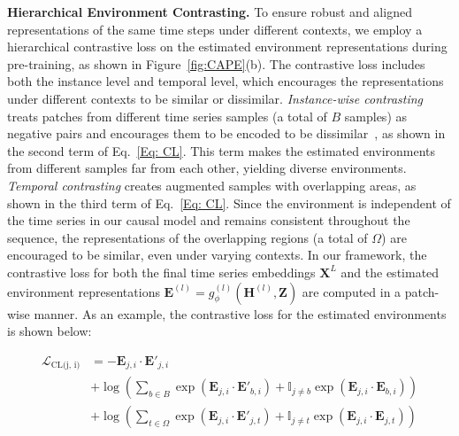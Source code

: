 \noindent\textbf{Hierarchical Environment Contrasting.} 
To ensure robust and aligned representations of the same time steps under different contexts, we employ a hierarchical contrastive loss on the estimated environment representations during pre-training, as shown in Figure~\ref{fig:CAPE}(b). The contrastive loss includes both the instance level and temporal level, which encourages the representations under different contexts to be similar or dissimilar.
\textit{Instance-wise contrasting} treats patches from different time series samples (a total of $B$ samples) as negative pairs and encourages them to be encoded to be dissimilar~\cite{yue2022ts2vec}, as shown in the second term of Eq.~\ref{Eq: CL}. This term makes the estimated environments from different samples far from each other, yielding diverse environments.
\textit{Temporal contrasting} creates augmented samples with overlapping areas, as shown in the third term of Eq.~\ref{Eq: CL}. 
Since the environment is independent of the time series in our causal model and remains consistent throughout the sequence, the representations of the overlapping regions (a total of $\Omega$) are encouraged to be similar, even under varying contexts\cite{yue2022ts2vec}.
In our framework, the contrastive loss for both the final time series embeddings \( \mathbf{X}^{L} \) and the estimated environment representations $\mathbf{E}^{(l)} = g_{\phi}^{(l)}(\mathbf{H}^{(l)}, \mathbf{Z})$ are computed in a patch-wise manner. As an example, the contrastive loss for the estimated environments is shown below:

{
\small
\begin{align}
\label{Eq: CL}
\mathcal{L}_{\text{CL(j, i)}} &= - \mathbf{E}_{j,i} \cdot \mathbf{E'}_{j,i} \nonumber \\
&+ \log \left( \sum_{b\in B} \exp \left( \mathbf{E}_{j,i} \cdot \mathbf{E'}_{b,i} \right) + \mathbb{I}_{j \neq b} \exp \left( \mathbf{E}_{j,i} \cdot \mathbf{E}_{b,i} \right) \right) \nonumber \\
&+ \log \left( \sum_{t \in \Omega} \exp \left( \mathbf{E}_{j,i} \cdot \mathbf{E'}_{j,t} \right) + \mathbb{I}_{j \neq t} \exp \left( \mathbf{E}_{j,i} \cdot \mathbf{E}_{j,t} \right) \right)
\tag{13}
\end{align}
}

